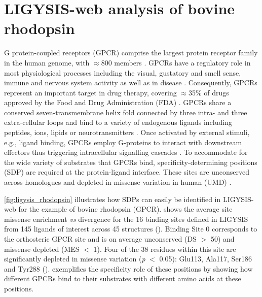 \section{LIGYSIS-web analysis of bovine rhodopsin}

G protein-coupled receptors (GPCR) comprise the largest protein receptor family in the human genome, with $\approx$800 members \cite{LIU_2024_GPCRs}. GPCRs have a regulatory role in most physiological processes including the visual, gustatory and smell sense, immune and nervous system activity as well as in disease \cite{LATORRACA_2017_GPCRs}. Consequently, GPCRs represent  an important target in drug therapy, covering $\approx$35\% of drugs approved by the Food and Drug Administration (FDA) \cite{HAUSER_2017_GPCRS, INSEL_2019_GPCRs}. GPCRs share a conserved seven-transmembrane helix fold connected by three intra- and three extra-cellular loops \cite{ZHANG_2024_GPCRs} and bind to a variety of endogenous ligands including peptides, ions, lipids or neurotransmitters \cite{ZARZYCKA_2019_GPCRs, MANNES_2022_GPCRs}. Once activated by external stimuli, e.g., ligand binding, GPCRs employ G-proteins to interact with downstream effectors thus triggering intracellular signalling cascades \cite{CHENG_2023_GPCRs}. To accommodate for the wide variety of substrates that GPCRs bind, specificity-determining positions (SDP) are required at the protein-ligand interface. These sites are unconserved across homologues and depleted in missense variation in human (UMD) \cite{MACGOWAN_2024_VARIANTS}.

\autoref{fig:ligysis_rhodopsin} illustrates how SDPs can easily be identified in LIGYSIS-web for the example of bovine rhodopsin (GPCR).  shows the average site missense enrichment \textit{vs} divergence for the 16 binding sites defined in LIGYSIS from 145 ligands of interest across 45 structures (). Binding Site 0 corresponds to the orthosteric GPCR site and is on average unconserved (DS $>$ 50) and missense-depleted (MES $<$ 1). Four of the 38 residues within this site are significantly depleted in missense variation (\textit{p} $<$ 0.05): Glu113, Ala117, Ser186 and Tyr288 ().  exemplifies the specificity role of these positions by showing how different GPCRs bind to their substrates with different amino acids at these positions.

